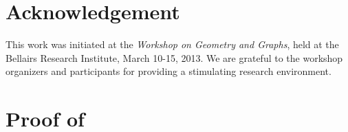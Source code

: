 \documentclass{patmorin}
\begin{document}
\section*{Acknowledgement}

This work was initiated at the \emph{Workshop on Geometry and Graphs},
held at the Bellairs Research Institute, March 10-15, 2013.  We are
grateful to the workshop organizers and participants for providing
a stimulating research environment.




\appendix

\section{Proof of }
\end{document}
